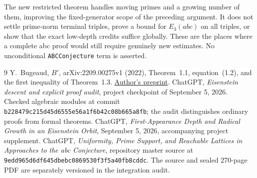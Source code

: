 \documentclass[11pt]{amsart}
\theoremstyle{definition}\newtheorem{definition}[theorem]{Definition}
\theoremstyle{remark}\newtheorem{remark}[theorem]{Remark}
\begin{document}
The new restricted theorem handles moving primes and a growing number of them, improving the fixed-generator scope of the preceding argument. It does not settle prime-norm terminal triples, prove a bound for $E_3(abc)$ on all triples, or show that the exact low-depth credits suffice globally. These are the places where a complete abc proof would still require genuinely new estimates. No unconditional \texttt{ABCConjecture} term is asserted.

\begin{thebibliography}{9}
 Y.~Bugeaud, $B'$, arXiv:2209.00275v1 (2022), Theorem~1.1, equation~(1.2), and the first inequality of Theorem~1.3. \href{https://arxiv.org/abs/2209.00275}{Author's preprint}.
 ChatGPT, \emph{Eisenstein descent and explicit proof audit}, project checkpoint of September 5, 2026. Checked algebraic modules at commit \texttt{b228479c215d45d6555e56a1f6b42c08b665a8fb}; the audit distinguishes ordinary proofs from formal theorems.
 ChatGPT, \emph{First-Appearance Depth and Radical Growth in an Eisenstein Orbit}, September 5, 2026, accompanying project supplement.
 ChatGPT, \emph{Uniformity, Prime Support, and Reachable Lattices in Approaches to the abc Conjecture}, repository master source at \texttt{9edd965d6df645dbebc0869530f3f5a40fb8cddc}. The source and sealed 270-page PDF are separately versioned in the integration audit.
\end{thebibliography}
\end{document}

